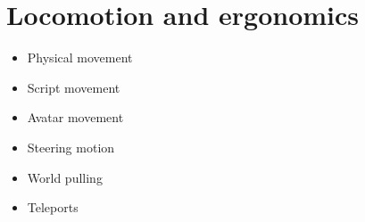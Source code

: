 \section{Locomotion and ergonomics}
\begin{itemize}
  \item Physical movement
  \item Script movement
  \item Avatar movement
  \item Steering motion
  \item World pulling
  \item Teleports
\end{itemize}
